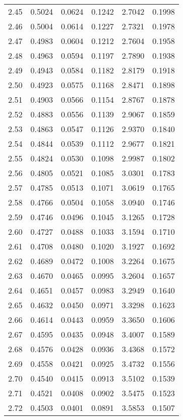 \documentclass{article}
\begin{document}
\begin{longtable}{cccccc}
2.45 & 0.5024 & 0.0624 & 0.1242 & 2.7042 & 0.1998 \\
2.46 & 0.5004 & 0.0614 & 0.1227 & 2.7321 & 0.1978 \\
2.47 & 0.4983 & 0.0604 & 0.1212 & 2.7604 & 0.1958 \\
2.48 & 0.4963 & 0.0594 & 0.1197 & 2.7890 & 0.1938 \\
2.49 & 0.4943 & 0.0584 & 0.1182 & 2.8179 & 0.1918 \\
2.50 & 0.4923 & 0.0575 & 0.1168 & 2.8471 & 0.1898 \\
2.51 & 0.4903 & 0.0566 & 0.1154 & 2.8767 & 0.1878 \\
2.52 & 0.4883 & 0.0556 & 0.1139 & 2.9067 & 0.1859 \\
2.53 & 0.4863 & 0.0547 & 0.1126 & 2.9370 & 0.1840 \\
2.54 & 0.4844 & 0.0539 & 0.1112 & 2.9677 & 0.1821 \\
2.55 & 0.4824 & 0.0530 & 0.1098 & 2.9987 & 0.1802 \\
2.56 & 0.4805 & 0.0521 & 0.1085 & 3.0301 & 0.1783 \\
2.57 & 0.4785 & 0.0513 & 0.1071 & 3.0619 & 0.1765 \\
2.58 & 0.4766 & 0.0504 & 0.1058 & 3.0940 & 0.1746 \\
2.59 & 0.4746 & 0.0496 & 0.1045 & 3.1265 & 0.1728 \\
2.60 & 0.4727 & 0.0488 & 0.1033 & 3.1594 & 0.1710 \\
2.61 & 0.4708 & 0.0480 & 0.1020 & 3.1927 & 0.1692 \\
2.62 & 0.4689 & 0.0472 & 0.1008 & 3.2264 & 0.1675 \\
2.63 & 0.4670 & 0.0465 & 0.0995 & 3.2604 & 0.1657 \\
2.64 & 0.4651 & 0.0457 & 0.0983 & 3.2949 & 0.1640 \\
2.65 & 0.4632 & 0.0450 & 0.0971 & 3.3298 & 0.1623 \\
2.66 & 0.4614 & 0.0443 & 0.0959 & 3.3650 & 0.1606 \\
2.67 & 0.4595 & 0.0435 & 0.0948 & 3.4007 & 0.1589 \\
2.68 & 0.4576 & 0.0428 & 0.0936 & 3.4368 & 0.1572 \\
2.69 & 0.4558 & 0.0421 & 0.0925 & 3.4732 & 0.1556 \\
2.70 & 0.4540 & 0.0415 & 0.0913 & 3.5102 & 0.1539 \\
2.71 & 0.4521 & 0.0408 & 0.0902 & 3.5475 & 0.1523 \\
2.72 & 0.4503 & 0.0401 & 0.0891 & 3.5853 & 0.1507 \\

\end{longtable}
\end{document}
